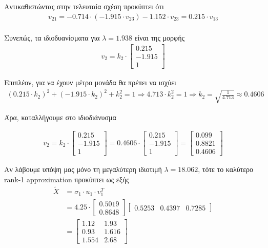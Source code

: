 \documentclass{article}
\begin{document}
	\noindent
	Αντικαθιστώντας στην τελευταία σχέση προκύπτει ότι
	\begin{align*}	
			v_{21} = -0.714 \cdot (-1.915 \cdot v_{23}) - 1.152 \cdot v_{23}  = 0.215 \cdot v_{13}\\
	\end{align*}
	
	\noindent
	Συνεπώς, τα ιδιοδυανίσματα για $λ = 1.938$ είναι της μορφής 
	\begin{align*}	
		v_{2} = k_{2} \cdot
		\begin{bmatrix}
			0.215 \\
			-1.915 \\
			1 
		\end{bmatrix}
	\end{align*}
	
	\noindent
	Επιπλέον, για να έχουν μέτρο μονάδα θα πρέπει να ισχύει
	\begin{align*}	
		(0.215 \cdot k_{2})^2 + (-1.915 \cdot k_{2})^2 + k_{2}^2 = 1 \Rightarrow 
		4.713 \cdot k_{2}^2 = 1 \Rightarrow
		k_{2} = \sqrt{\frac{1}{4.713}} \approx 0.4606
	\end{align*}	
	
	\noindent
	Άρα, καταλλήγουμε στο ιδιοδιάνυσμα
	
	\begin{align*}	
		v_{2} = k_{2} \cdot
		\begin{bmatrix}
			0.215 \\
			-1.915 \\
			1 
		\end{bmatrix} = 
		0.4606 \cdot
		\begin{bmatrix}
			0.215 \\
			-1.915 \\
			1 
		\end{bmatrix} = 
		\begin{bmatrix}
			0.099 \\
			0.8821 \\
			0.4606
		\end{bmatrix}
	\end{align*}

	\noindent
	Aν λάβουμε υπόψη μας μόνο τη μεγαλύτερη ιδιοτιμή $λ = 18.062$, τότε το καλύτερο rank-1 approximation προκύπτει ως εξής
	\begin{align*}	
		\tilde{X} &= σ_{1} \cdot u_1 \cdot v_{1}^T \\
				  &= 4.25 \cdot 
				  	 \begin{bmatrix}
				  	 	0.5019 \\
				  	 	0.8648 
				  	 \end{bmatrix}
				  	 \begin{bmatrix}
						0.5253 & 0.4397 & 0.7285
					 \end{bmatrix} \\
				  &= \begin{bmatrix}
				  		1.12 & 1.93 \\ 
				  		0.93 & 1.616 \\
				  		1.554 & 2.68
				  	 \end{bmatrix} 
	\end{align*} 
\end{document}
